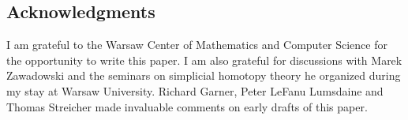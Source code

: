 \documentclass{amsart}
\theoremstyle{plain}
\theoremstyle{definition}
\begin{document}
\subsection*{Acknowledgments} 
I am grateful to the Warsaw Center of Mathematics and Computer Science for the opportunity to write this paper. I am also grateful for discussions with Marek Zawadowski and the seminars on simplicial homotopy theory he organized during my stay at Warsaw University. Richard Garner, Peter LeFanu Lumsdaine and Thomas Streicher made invaluable comments on early drafts of this paper.



{}
\end{document}
